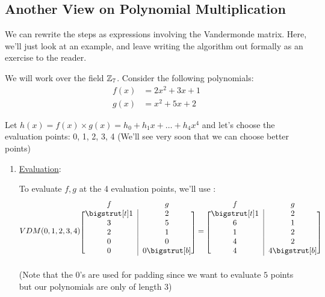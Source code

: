 \subsection{Another View on Polynomial Multiplication}
We can rewrite the steps  as expressions involving the Vandermonde matrix.
Here, we'll just look at an example, and leave writing the algorithm out formally as an exercise to the reader.

\begin{example}{}{}
    We will work over the field $\operatorname{\mathbb{Z}}_7$.
    Consider the following polynomials:
    \begin{align*}
        f(x) &= 2x^2 + 3x + 1 \\
        g(x) &= x^2 + 5x + 2
    \end{align*}

    Let $h(x) = f(x) \times g(x) = h_0 + h_1x + \ldots + h_4x^4$ and let's choose the evaluation points: 0, 1, 2, 3, 4 (We'll see very soon that we can choose better points)
    \begin{enumerate}
        \item \ul{Evaluation}:

        To evaluate $f, g$ at the 4 evaluation points, we'll use :
        \begin{equation*}
            VDM(0,1,2,3,4)
            \begin{blockarray}{cc}
                f & g \\
                \begin{block}{[c|c]}
                    \bigstrut[t] 1 & 2 \\
                    3 & 5 \\
                    2 & 1 \\
                    0 & 0 \\
                    0 & 0 \bigstrut[b] \\
                \end{block}
            \end{blockarray}
            =
            \begin{blockarray}{cc}
                f & g \\
                \begin{block}{[c|c]}
                    \bigstrut[t] 1 & 2 \\
                    6 & 1 \\
                    1 & 2 \\
                    4 & 2 \\
                    4 & 4 \bigstrut[b] \\
                \end{block}
            \end{blockarray}
        \end{equation*} 
        (Note that the $0$'s are used for padding since we want to evaluate $5$ points but our polynomials are only of length $3$)


\end{enumerate}
\end{example}
